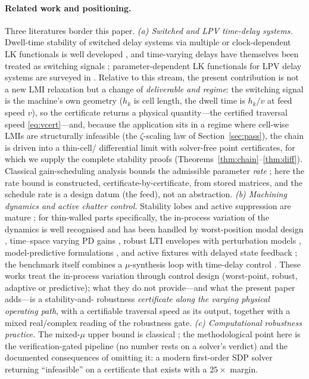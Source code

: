 \documentclass[preprint,12pt]{elsarticle}
\begin{document}
\paragraph{Related work and positioning.}
Three literatures border this paper.
\emph{(a) Switched and LPV time-delay systems.}  Dwell-time stability
of switched delay systems via multiple or clock-dependent LK
functionals is well developed
\cite{Koru2018,Koru2018b,Sobhanipour2023,Zhao2013}, and time-varying
delays have themselves been treated as switching signals
\cite{Zeng2025}; parameter-dependent LK functionals for LPV delay
systems are surveyed in \cite{Briat2015}.  Relative to this stream,
the present contribution is not a new LMI relaxation but a change of
\emph{deliverable and regime}: the switching signal is the machine's
own geometry ($h_k$ is cell length, the dwell time is $h_k/v$ at feed
speed $v$), so the certificate returns a physical quantity---the
certified traversal speed \eqref{eq:vcert}---and, because the
application sits in a regime where cell-wise LMIs are structurally
infeasible (the $\zeta$-scaling law of
Section~\ref{sec:pass}), the chain is driven into a thin-cell/
differential limit with solver-free point certificates, for which we
supply the complete stability proofs
(Theorems~\ref{thm:chain}--\ref{thm:diff}).  Classical gain-scheduling
analysis bounds the admissible parameter \emph{rate}
\cite{ShammaAthans1990,Rugh2000}; here the rate bound is constructed,
certificate-by-certificate, from stored matrices, and the schedule
rate is a design datum (the feed), not an abstraction.
\emph{(b) Machining dynamics and active chatter control.}  Stability
lobes and active suppression are mature
\cite{Altintas1995,Munoa2016}; for thin-walled parts specifically, the
in-process variation of the dynamics is well recognised and has been
handled by worst-position modal design \cite{Du2022}, time--space
varying PD gains \cite{Wang2019}, robust LTI envelopes with
perturbation models \cite{Zhang2019,Li2021}, model-predictive
formulations \cite{Li2019}, and active fixtures with delayed state
feedback \cite{Dong2023}; the benchmark itself combines a
$\mu$-synthesis loop with time-delay control \cite{Du2024}.  These works treat the in-process variation through control design
(worst-point, robust, adaptive or predictive); what they do not
provide---and what the present paper adds---is a stability-and-%
robustness \emph{certificate along the varying physical operating
path}, with a certifiable traversal speed as its output, together
with a mixed real/complex reading of the robustness gate.
\emph{(c) Computational robustness practice.}  The mixed-$\mu$ upper
bound is classical \cite{Fan1991,Young1992,Packard1993}; the
methodological point here is the verification-gated pipeline (no
number rests on a solver's verdict) and the documented consequences of
omitting it: a modern first-order SDP solver returning ``infeasible''
on a certificate that exists with a $25\times$ margin.
\end{document}
